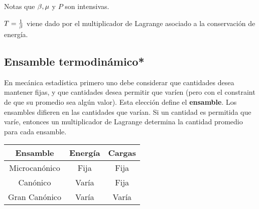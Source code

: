 Notas que $\beta,\mu$ y $P$ son intensivas.

$T=\frac{1}{\beta}$ viene dado por el multiplicador de Lagrange asociado a la conservación de energía.

\subsection{Ensamble termodinámico*}
En mecánica estadística primero uno debe considerar que cantidades desea mantener fijas, y que cantidades desea permitir que varíen (pero con el constraint de que su promedio sea algún valor). Esta elección define el \textbf{ensamble}. Los ensambles difieren en las cantidades que varían. Si un cantidad es permitida que varíe, entonces un multiplicador de Lagrange determina la cantidad promedio para cada ensamble.

\begin{center}
\begin{tabular}{|c|c|c|}
\hline
  Ensamble & Energía & Cargas  \\
  \hline
  Microcanónico &Fija& Fija \\\hline
  Canónico&Varía &Fija\\\hline
  Gran Canónico&Varía&Varía\\\hline
\end{tabular}
\end{center}






































